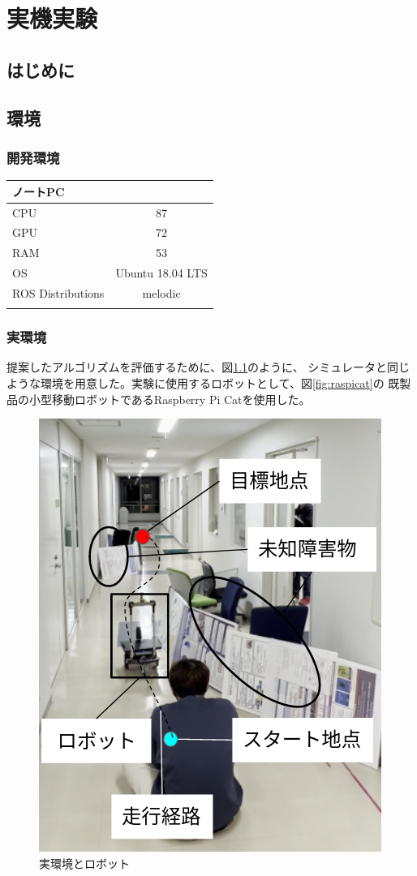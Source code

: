 \chapter{実機実験}\label{chap:practical_experiment}

\section{はじめに}

\section{環境}

\subsection{開発環境}

\begin{center}
  \begin{tabular}{l|c} 
    \thline
    ノートPC&\\
    \hline
    CPU & 87  \\
    GPU & 72   \\
    RAM & 53   \\
    OS & Ubuntu 18.04 LTS   \\
    ROS Distributions & melodic   \\ 
    \thline
  \end{tabular}
\end{center}


\subsection{実環境}

提案したアルゴリズムを評価するために、図\ref{fig:real_environment}のように、
シミュレータと同じような環境を用意した。実験に使用するロボットとして、図\ref{fig:raspicat}の
既製品の小型移動ロボットであるRaspberry Pi Catを使用した。


\begin{figure}[H]
  \begin{center}
    \includegraphics[width=0.5\linewidth]{figs/real_environment.png}
    \caption{実環境とロボット}
    \label{fig:real_environment}
  \end{center}
\end{figure}

